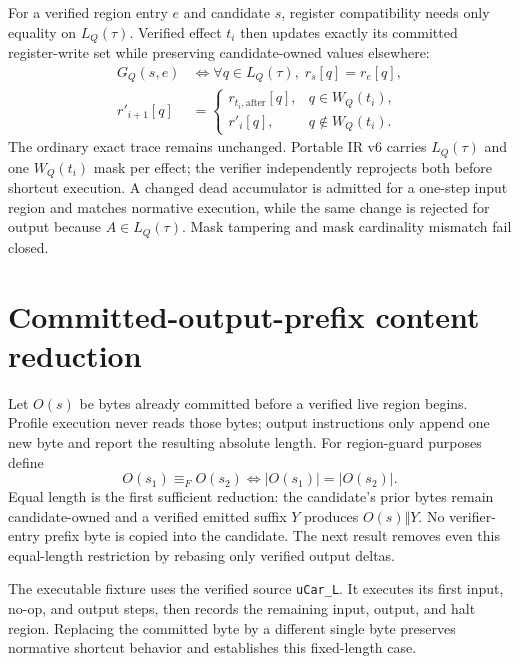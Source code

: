\documentclass{article}
\begin{document}
For a verified region entry $e$ and candidate $s$, register compatibility needs
only equality on $L_Q(\tau)$. Verified effect $t_i$ then updates exactly its
committed register-write set while preserving candidate-owned values elsewhere:
\begin{equation}
  \begin{aligned}
  G_Q(s,e) &\Longleftrightarrow
    \forall q\in L_Q(\tau),\;r_s[q]=r_e[q],\\
  r'_{i+1}[q] &=
    \begin{cases}
      r_{t_i,\mathrm{after}}[q], & q\in W_Q(t_i),\\
      r'_i[q], & q\notin W_Q(t_i).
    \end{cases}
  \end{aligned}
  \label{eq:state-graph-region-register-rebase}
\end{equation}
The ordinary exact trace remains unchanged. Portable IR v6 carries
$L_Q(\tau)$ and one $W_Q(t_i)$ mask per effect; the verifier independently
reprojects both before shortcut execution. A changed dead accumulator is
admitted
for a one-step input region and matches normative execution, while the same
change is rejected for output because $A\in L_Q(\tau)$. Mask tampering and mask
cardinality mismatch fail closed.

\section{Committed-output-prefix content reduction}

Let $O(s)$ be bytes already committed before a verified live region begins.
Profile execution never reads those bytes; output instructions only append one
new byte and report the resulting absolute length. For region-guard purposes
define
\begin{equation}
  O(s_1)\equiv_F O(s_2)
  \Longleftrightarrow |O(s_1)|=|O(s_2)|.
  \label{eq:state-graph-region-output-prefix-content}
\end{equation}
Equal length is the first sufficient reduction: the candidate's prior bytes
remain candidate-owned and a verified emitted suffix $Y$ produces
$O(s)\Vert Y$. No verifier-entry prefix byte is copied into the candidate. The
next result removes even this equal-length restriction by rebasing only verified
output deltas.

The executable fixture uses the verified source \texttt{uCar\_L}. It executes
its first input, no-op, and output steps, then records the remaining input,
output, and halt region. Replacing the committed byte by a different single byte
preserves normative shortcut behavior and establishes this fixed-length case.
\end{document}
